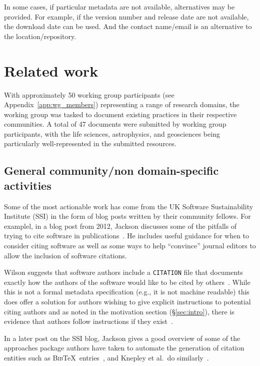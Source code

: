 \documentclass[12pt, oneside]{amsart}
\begin{document}
In some cases, if particular metadata are not available, alternatives may be provided.
For example, if the version number and release date are not available, the download date can be used.
And the contact name\slash email is an alternative to the location\slash repository.


\section{Related work}
\label{sec:related_work}

With approximately 50 working group participants (see Appendix~\ref{app:wg_members})
representing a range of research domains, the working group was tasked to
document existing practices in their respective communities. A total of 47
documents were submitted by working group participants, with the life sciences,
astrophysics, and geosciences being particularly well-represented in the
submitted resources.

\subsection{General community/non domain-specific activities}

Some of the most actionable work has come from the UK Software Sustainability
Institute (SSI) in the form of blog posts written by their community fellows.
For examplel, in a blog post from 2012, Jackson discusses some of the pitfalls
of trying to cite software in publications~\cite{ssi-how-to-cite}. He includes
useful guidance for when to consider citing software as well as some ways to help
``convince'' journal editors to allow the inclusion of software citations.

Wilson suggests that software authors include a \texttt{CITATION} file that
documents exactly how the authors of the software would like to be cited by
others~\cite{ssi-citation-files}. While this is not a formal metadata
specification (e.g., it is not machine readable) this does offer a solution for
authors wishing to give explicit instructions to potential citing authors and as
noted in the motivation section (\S\ref{sec:intro}), there is evidence that
authors follow instructions if they exist~\cite{10.1371/journal.pone.0136631}.

In a later post on the SSI blog, Jackson gives a good overview of some of the
approaches package authors have taken to automate the generation of citation
entities such as \textsc{Bib}\TeX\ entries~\cite{ssi-how-shalt-i-cite-thee}, and
Knepley et al.\ do similarly~\cite{knepley2013accurately}.
\end{document}
